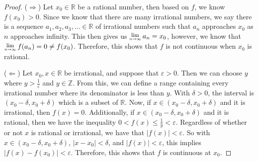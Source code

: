 \documentclass[11pt]{article}
\newcommand{\R}{\mathbb{R}}
\newcommand{\Z}{\mathbb{Z}}
\newcommand{\Lim}[1]{\raisebox{0.5ex}{\scalebox{0.8}{$\displaystyle \lim_{#1}\;$}}}
\begin{document}
\begin{proof}
	($\Longrightarrow$) Let $x_0 \in \R$ be a rational number, then based on $f$, we know $f(x_0) > 0$. Since we know that there are many irrational numbers, we say there is a sequence $a_1, a_2, a_3, \ldots \in \R$ of irrational numbers such that $a_n$ approaches $x_0$ as $n$ approaches infinity. This then gives us $\Lim{n \rightarrow \infty} a_n = x_0$, however, we know that $\Lim{n \rightarrow \infty}f(a_n) = 0 \not = f(x_0)$. Therefore, this shows that $f$ is not continuous when $x_0$ is rational.

	($\Longleftarrow$) Let $x_0, x \in \R$ be irrational, and suppose that $\varepsilon > 0$. Then we can choose $y$ where $y > \frac{1}{\varepsilon}$ and $y \in \Z$. From this, we can define a range containing every irrational number where its denominator is less than $y$. With $\delta > 0$, the interval is $(x_0 - \delta, x_0 + \delta)$ which is a subset of $\R$. Now, if $x \in (x_0 - \delta, x_0 + \delta)$ and it is irrational, then $f(x)=0$. Additionally, if $x \in (x_0 - \delta, x_0 + \delta)$ and it is rational, then we have the inequality $0 < f(x) \le \frac{1}{y} < \varepsilon$. Regardless of whether or not $x$ is rational or irrational, we have that $|f(x)| < \varepsilon$. So with $x \in (x_0 - \delta, x_0 + \delta)$, $|x-x_0| < \delta$, and $|f(x)| < \varepsilon$, this implies $|f(x)-f(x_0)| < \varepsilon$. Therefore, this shows that $f$ is continuous at $x_0$.
\end{proof}




	
\end{document}
